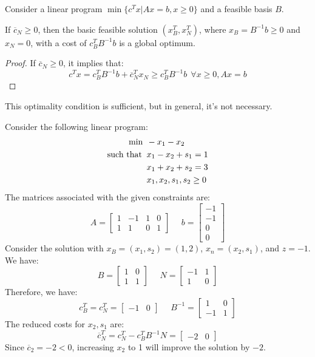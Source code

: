 Consider a linear program $\min\{c^Tx|Ax=b,x\geq 0\}$ and a feasible basis $B$. 
\begin{proposition}
    If $\overline{c}_N \geq 0$, then the basic feasible solution $(x_B^T,x_N^T)$, where $x_B=B^{-1}b \geq 0$ and $x_N = 0$, with a cost of  $c_B^TB^{-1}b$ is a global optimum. 
\end{proposition}
\begin{proof}
    If $\overline{c}_N \geq 0$, it implies that: 
    \[c^Tx=c_B^TB^{-1}b+\overline{c}_N^Tx_N \geq c_B^TB^{-1}b \:\: \forall x \geq 0, Ax=b\]
\end{proof}
This optimality condition is sufficient, but in general, it's not necessary.
\begin{example}
    Consider the following linear program: 
    \begin{align*}
        \min                      \:&\: -x_1-x_2          \\
        \textnormal{such that }     &\: x_1-x_2+s_1=1  \\
                                    &\: x_1+x_2+s_2=3  \\
                                    &\: x_1,x_2,s_1,s_2 \geq 0
    \end{align*}
    The matrices associated with the given constraints are:
    \[
    A=
    \begin{bmatrix}
        1 & -1 & 1 & 0  \\
        1 & 1 & 0 & 1 
    \end{bmatrix}
    \:\:\:\:\:\:
    b=
    \begin{bmatrix}
        -1 \\
        -1 \\
        0  \\
        0
    \end{bmatrix}
    \]
    Consider the solution with $x_B=(x_1,s_2)=(1,2)$, $x_n=(x_2,s_1)$, and $z=-1$. 
    We have:
    \[
    B=
    \begin{bmatrix}
        1 & 0  \\
        1 & 1  
    \end{bmatrix}
    \:\:\:\:\:\:
    N=
    \begin{bmatrix}
        -1 & 1  \\
        1  & 0  
    \end{bmatrix}
    \]
    Therefore, we have:
    \[c_B^T=c_N^T=\begin{bmatrix} -1 & 0 \end{bmatrix} \:\:\:\:\:\: B^{-1}=
    \begin{bmatrix}
        1  & 0  \\
        -1 & 1  
    \end{bmatrix}
    \]
    The reduced costs for $x_2,s_1$ are: 
    \[\overline{c}_N^T=c_N^T-c_B^TB^{-1}N=\begin{bmatrix} -2 & 0 \end{bmatrix}\]
    Since $\overline{c}_2=-2<0$, increasing $x_2$ to 1 will improve the solution by $-2$. 
\end{example}
